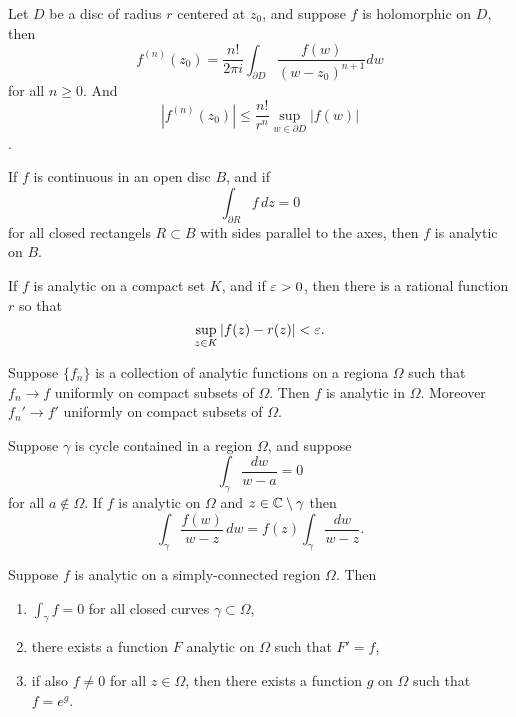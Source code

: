 \documentclass[12pt]{article}
\begin{document}
\begin{sats}
    Let $D$ be a disc of radius $r$ centered at $z_0$, and suppose $f$ is holomorphic on $D$, then $$f^{(n)}(z_0)=\frac{n!}{2\pi i}\int_{\partial D} \frac{f(w)}{(w-z_0)^{n+1}}dw$$ for all $n\geq 0$. And $$|f^{(n)}(z_0)|\leq\frac{n!}{r^n}\sup_{w\in\partial D} |f(w)|$$.
\end{sats}

\begin{sats}[Morea]
    If $f$ is continuous in an open disc $B$, and if $$\int_{\partial R} f \, dz=0$$ for all closed rectangels $R\subset B$ with sides parallel to the axes, then $f$ is analytic on $B$. 
\end{sats}

\begin{sats}[Runge]
    If $f$ is analytic on a compact set $K$, and if $\varepsilon>0$, then there is a rational function $r$ so that 
    \begin{equation*}
        \sup_{z\in K}|f(z)-r(z)|<\varepsilon.
    \end{equation*}
\end{sats}

\begin{sats}[Weirstrass]
    Suppose $\{f_n\}$ is a collection of analytic functions on a regiona $\Omega$ such that $f_n\to f$ uniformly on compact subsets of $\Omega$. Then $f$ is analytic in $\Omega$. Moreover $f_n'\to f'$ uniformly on compact subsets of $\Omega$.
\end{sats}

\begin{sats}
    Suppose $\gamma$ is cycle contained in a region $\Omega$, and suppose $$\int_\gamma \frac{dw}{w-a}=0$$ for all $a\notin\Omega$. If $f$ is analytic on $\Omega$ and $z\in \mathbb{C}\setminus\gamma$ then $$\int_\gamma \frac{f(w)}{w-z}\,dw=f(z)\int_\gamma \frac{dw}{w-z}.$$
\end{sats}

\begin{sats}
    Suppose $f$ is analytic on a simply-connected region $\Omega$. Then 
    \begin{enumerate}[label=(\roman*)]
        \item $\int_\gamma f = 0$ for all closed curves $\gamma\subset\Omega$,
        \item there exists a function $F$ analytic on $\Omega$ such that $F'=f$,
        \item if also $f\neq 0$ for all $z\in\Omega$, then there exists a function $g$ on $\Omega$ such that $f=e^g$.
    \end{enumerate}
\end{sats}
\end{document}
